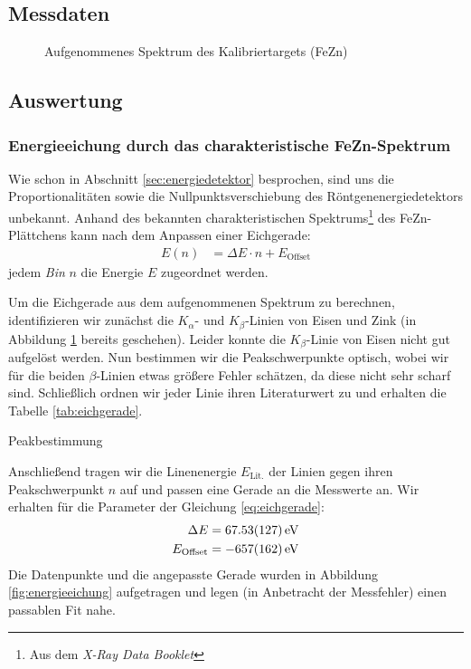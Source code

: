 \documentclass[11pt, a4paper]{article}
\begin{document}
\subsection{Messdaten}
\begin{figure}[h]
\centering

\caption{Aufgenommenes Spektrum des Kalibriertargets (FeZn)}
\label{fig:kalibrierung}
\end{figure}

\subsection{Auswertung}
\subsubsection{Energieeichung durch das charakteristische FeZn-Spektrum}
Wie schon in Abschnitt \ref{sec:energiedetektor} besprochen, sind uns die Proportionalitäten sowie die Nullpunktsverschiebung des Röntgenenergiedetektors unbekannt.
Anhand des bekannten charakteristischen Spektrums\footnote{Aus dem \emph{X-Ray Data Booklet}\cite{booklet}} des FeZn-Plättchens kann nach dem Anpassen einer Eichgerade:
\begin{align}
  E(n) &= \Delta E \cdot n + E_\mathrm{Offset}
  \label{eq:eichgerade}
\end{align}
jedem \emph{Bin} $n$ die Energie $E$ zugeordnet werden.

Um die Eichgerade aus dem aufgenommenen Spektrum zu berechnen, identifizieren wir zunächst die $K_\alpha$- und $K_\beta$-Linien von Eisen und Zink (in Abbildung \ref{fig:kalibrierung} bereits geschehen).
Leider konnte die $K_\beta$-Linie von Eisen nicht gut aufgelöst werden.
Nun bestimmen wir die Peakschwerpunkte optisch, wobei wir für die beiden $\beta$-Linien etwas größere Fehler schätzen, da diese nicht sehr scharf sind.
Schließlich ordnen wir jeder Linie ihren Literaturwert zu und erhalten die Tabelle \ref{tab:eichgerade}.
\begin{table}[h]
\centering

\caption{Peakbestimmung}
\label{tab:eichgerade}
\end{table}

Anschließend tragen wir die Linenenergie $E_\mathrm{Lit.}$ der Linien gegen ihren Peakschwerpunkt $n$ auf und passen eine Gerade an die Messwerte an.
Wir erhalten für die Parameter der Gleichung \ref{eq:eichgerade}:
\begin{align}
  \Delta E &= \SI{67,53 +- 1,27}{\electronvolt}\\
  E_\mathrm{Offset} &= \SI{-657 +- 162}{\electronvolt}
\end{align}
Die Datenpunkte und die angepasste Gerade wurden in Abbildung \ref{fig:energieeichung} aufgetragen und legen (in Anbetracht der Messfehler) einen passablen Fit nahe.
\end{document}
